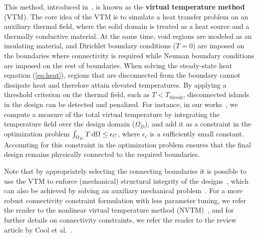 This method, introduced in~\cite{li_structural_2016}, is known as the \textbf{virtual temperature method} (VTM). The core idea of the VTM is to simulate a heat transfer problem on an auxiliary thermal field, where the solid domain
 is treated as a heat source and a thermally conductive material. At the same time, void regions are modeled as an
insulating material, and Dirichlet boundary conditions ($T = 0$) are imposed on the boundaries where connectivity is required while Neuman boundary conditions are imposed
on the rest of boundaries. When 
solving the steady-state heat equation (\eqref{eq:heat}), regions that are disconnected from the boundary 
cannot dissipate heat and therefore attain elevated temperatures. By applying a threshold criterion on the thermal field, such as $T < T_\text{thresh}$, disconnected islands in the design can be 
detected and penalized. For instance, in our works~\cite{ownpub1,ownpub2}, we compute a measure of the total virtual temperature
by integrating the temperature field over the design domain ($\Omega_D$), and add it as a constraint in the optimization problem 
$\int_{\Omega_D} T \mathop{}\!\text{d} \Omega \leq \epsilon_C$, where $\epsilon_c$ is a sufficiently small constant. Accounting for this constraint in the optimization problem ensures that the final design remains physically connected to the required 
boundaries. 


Note that by appropriately selecting the connecting boundaries it is possible to use the VTM to enforce
(mechanical) structural integrity of the designs~\cite{structural_heat}, which can also be achieved by solving an auxiliary
mechanical problem~\cite{structural_integrity}. For a more robust connectivity constraint formulation with less parameter tuning, we refer the reader to the nonlinear 
virtual temperature method (NVTM)~\cite{nvtm}, and for further details on connectivity constraints, we refer the reader to the review 
article by Cool et al.~\cite{vanessa}.
